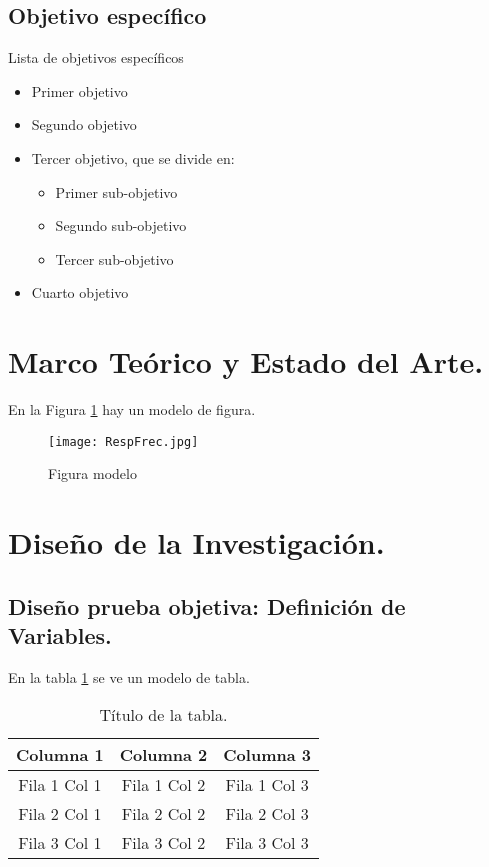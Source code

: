 \subsection{Objetivo específico}
Lista de objetivos específicos
\begin{itemize}
\item Primer objetivo
\item Segundo objetivo
\item Tercer objetivo, que se divide en:
	\begin{itemize}
		\item Primer sub-objetivo
		\item Segundo sub-objetivo
		\item Tercer sub-objetivo
	\end{itemize}
\item Cuarto objetivo
\end{itemize}

\section{Marco Teórico y Estado del Arte.}
En la Figura \ref{fig:RespFrec} hay un modelo de figura.

\begin{figure}[h]
	\centering
	\texttt{[image: RespFrec.jpg]}
	\caption[RespFrec]{Figura modelo} 
	\label{fig:RespFrec}
\end{figure}

\section{Diseño de la Investigación.}

\subsection{Diseño prueba objetiva: Definición de Variables.}
En la tabla \ref{tab:HRTFangles} se ve un modelo de tabla.

\begin{table}[h]
	\centering
	\caption{Título de la tabla.}
	\begin{tabular}{ccc}
		\hline
		\textbf{Columna 1}&\textbf{Columna 2}&\textbf{Columna 3}\\\hline
		
		Fila 1 Col 1 & Fila 1 Col 2 & Fila 1 Col 3\\\hline
		Fila 2 Col 1 & Fila 2 Col 2 & Fila 2 Col 3\\\hline
		Fila 3 Col 1 & Fila 3 Col 2 & Fila 3 Col 3\\\hline
	\end{tabular}  
	\label{tab:HRTFangles}
\end{table}

